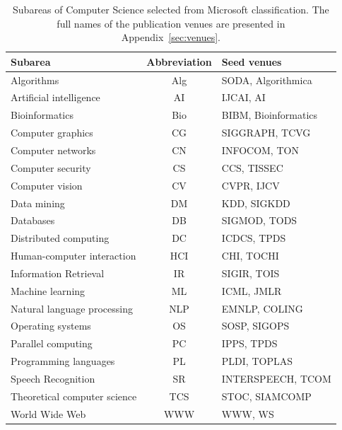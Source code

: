 \documentclass[msc]{ppgccufmg}
\begin{document}
\begin{table}[h]
\small
\centering
\caption{Subareas of Computer Science selected from Microsoft classification. The full names of the publication venues are presented in Appendix~\ref{sec:venues}.}
\label{tab:subareas}
\begin{tabular}{l|c|l} 
\toprule
Subarea                      & Abbreviation & Seed venues          \\ \hline
Algorithms                    & Alg          & SODA, Algorithmica   \\ \hline
Artificial intelligence      & AI           & IJCAI, AI            \\ \hline
Bioinformatics               & Bio          & BIBM, Bioinformatics \\ \hline
Computer graphics            & CG           & SIGGRAPH, TCVG       \\ \hline
Computer networks             & CN           & INFOCOM, TON         \\ \hline
Computer security            & CS           & CCS, TISSEC          \\ \hline
Computer vision              & CV           & CVPR, IJCV           \\ \hline
Data mining                  & DM           & KDD, SIGKDD          \\ \hline
Databases                     & DB           & SIGMOD, TODS         \\ \hline
Distributed computing        & DC           & ICDCS, TPDS          \\ \hline
Human-computer interaction   & HCI          & CHI, TOCHI           \\ \hline
Information Retrieval        & IR           & SIGIR, TOIS          \\ \hline
Machine learning             & ML           & ICML, JMLR           \\ \hline
Natural language processing  & NLP          & EMNLP, COLING        \\ \hline
Operating systems             & OS           & SOSP, SIGOPS         \\ \hline
Parallel computing           & PC           & IPPS, TPDS           \\ \hline
Programming languages         & PL           & PLDI, TOPLAS         \\ \hline
Speech Recognition           & SR           & INTERSPEECH, TCOM    \\ \hline
Theoretical computer science & TCS          & STOC, SIAMCOMP       \\ \hline
World Wide Web               & WWW          & WWW, WS              \\ 
\bottomrule
\end{tabular}
\end{table}
\end{document}

